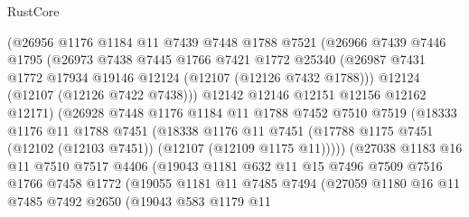 \begin{lexlean}{RustCore}
\begin{coremodule}
                  (@26956
                    @1176
                    @1184
                    @11
                    @7439
                    @7448
                    @1788
                    @7521
                    (@26966
                      @7439
                      @7446
                      @1795
                      (@26973
                        @7438
                        @7445
                        @1766
                        @7421
                        @1772
                        @25340
                        (@26987 @7431 @1772 @17934 @19146 @12124 (@12107 (@12126 @7432 @1788)))
                        @12124
                        (@12107 (@12126 @7422 @7438)))
                      @12142
                      @12146
                      @12151
                      @12156
                      @12162
                      @12171)
                    (@26928
                      @7448
                      @1176
                      @1184
                      @11
                      @1788
                      @7452
                      @7510
                      @7519
                      (@18333
                        @1176
                        @11
                        @1788
                        @7451
                        (@18338
                          @1176
                          @11
                          @7451
                          (@17788 @1175 @7451 (@12102 (@12103 @7451)) (@12107 (@12109 @1175 @11)))))
                      (@27038
                        @1183
                        @16
                        @11
                        @7510
                        @7517
                        @4406
                        (@19043
                          @1181
                          @632
                          @11
                          @15
                          @7496
                          @7509
                          @7516
                          @1766
                          @7458
                          @1772
                          (@19055
                            @1181
                            @11
                            @7485
                            @7494
                            (@27059
                              @1180
                              @16
                              @11
                              @7485
                              @7492
                              @2650
                              (@19043
                                @583
                                @1179
                                @11

\end{coremodule}
\end{lexlean}
